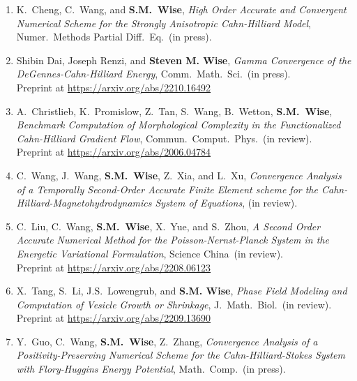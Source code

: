 \documentclass[11pt]{letter}
\begin{document}
\begin{enumerate}
	\item
K.~Cheng, C.~Wang, and \textbf{S.M.~Wise}, {\sl High Order Accurate and Convergent Numerical Scheme for the Strongly Anisotropic Cahn-Hilliard Model}, Numer.~Methods Partial Diff.~Eq.~(in press).

	\item
Shibin Dai, Joseph Renzi, and \textbf{Steven M. Wise}, {\sl Gamma Convergence of the DeGennes-Cahn-Hilliard Energy}, Comm.~Math.~Sci.~(in press). 
	\\
Preprint at \url{https://arxiv.org/abs/2210.16492}

	\item
A.~Christlieb, K.~Promislow, Z.~Tan, S.~Wang, B.~Wetton, \textbf{S.M.~Wise}, {\sl Benchmark Computation of Morphological Complexity in the Functionalized Cahn-Hilliard Gradient Flow}, Commun.~Comput.~Phys.~(in review).
	\\ 
Preprint at \url{https://arxiv.org/abs/2006.04784}


	\item
C.~Wang, J.~Wang, \textbf{S.M.~Wise}, Z.~Xia, and L.~Xu, {\sl Convergence Analysis of a Temporally Second-Order Accurate Finite Element scheme for the Cahn-Hilliard-Magnetohydrodynamics System of Equations}, (in review).

	\item
C.~Liu, C.~Wang, \textbf{S.M.~Wise}, X.~Yue, and S.~Zhou, {\sl A Second Order Accurate Numerical Method for the Poisson-Nernst-Planck System in the Energetic Variational Formulation}, Science China~(in review).
	\\
Preprint at \url{https://arxiv.org/abs/2208.06123}

	\item
X.~Tang, S.~Li, J.S.~Lowengrub, and \textbf{S.M. Wise}, {\sl Phase Field Modeling and Computation of Vesicle Growth or Shrinkage}, J.~Math.~Biol.~(in review).
	\\
Preprint at \url{https://arxiv.org/abs/2209.13690}

	\item
Y.~Guo, C.~Wang, \textbf{S.M.~Wise}, Z.~Zhang, {\sl Convergence Analysis of a Positivity-Preserving Numerical Scheme for the Cahn-Hilliard-Stokes System with Flory-Huggins Energy Potential}, Math.~Comp.~(in press).

	\end{enumerate}
\end{document}

